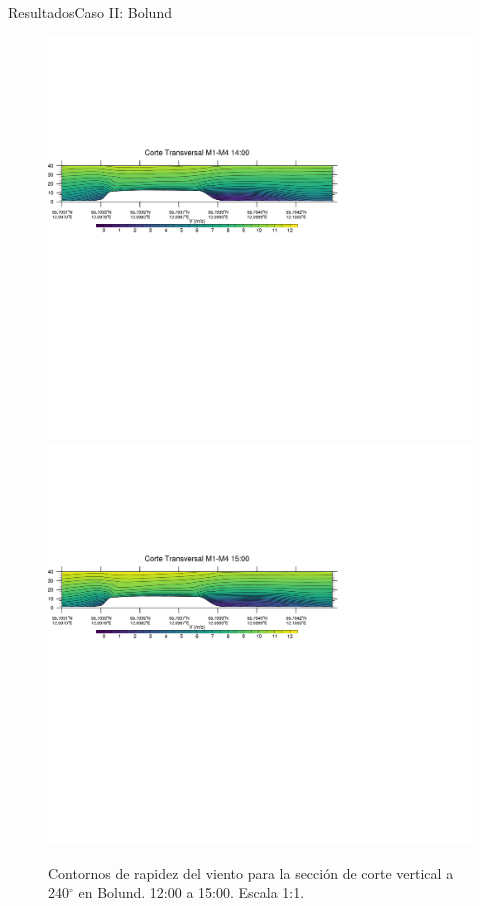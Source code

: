 \documentclass[mathserif,10pt]{beamer}
\begin{document}
\begin{frame}{Resultados}{Caso II: Bolund}
\begin{figure}[H]
		\includegraphics[width=0.80\linewidth,trim={0mm 202.0mm 111mm 106mm},clip]{fig/06/bol/1400rot}\\%
		\includegraphics[width=0.80\linewidth,trim={0mm 180.0mm 111mm 106mm},clip]{fig/06/bol/1500rot}%
		\vspace{-2mm}
		\caption{Contornos de rapidez del viento para la sección de corte vertical a 240$^\circ$ en Bolund. 12:00 a 15:00. Escala 1:1.}
		\label{fig:06_bol_cross}
	\end{figure}
\end{frame}
\end{document}
